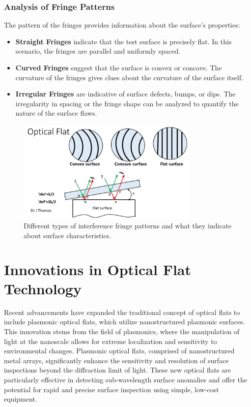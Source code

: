 \documentclass[../main.tex]{subfiles}
\begin{document}
\subsubsection{Analysis of Fringe Patterns}
The pattern of the fringes provides information about the surface's properties:
\begin{itemize}
    \item \textbf{Straight Fringes} indicate that the test surface is precisely flat. In this scenario, the fringes are parallel and uniformly spaced.
    \item \textbf{Curved Fringes} suggest that the surface is convex or concave. The curvature of the fringes gives clues about the curvature of the surface itself.
    \item \textbf{Irregular Fringes} are indicative of surface defects, bumps, or dips. The irregularity in spacing or the fringe shape can be analyzed to quantify the nature of the surface flaws.
\end{itemize}

\begin{frame}{}
    \begin{figure}[H]
    \centering
    \includegraphics[width=0.8\textwidth]{Images/Introduction/fringe_types}
    \caption{Different types of interference fringe patterns and what they indicate about surface characteristics.\cite{Joji_2023}}
    \label{fig:fringe-types}
    \end{figure}
\end{frame}

\section{Innovations in Optical Flat Technology}
Recent advancements have expanded the traditional concept of optical flats to include plasmonic optical flats, which utilize nanostructured plasmonic surfaces. This innovation stems from the field of plasmonics, where the manipulation of light at the nanoscale allows for extreme localization and sensitivity to environmental changes. Plasmonic optical flats, comprised of nanostructured metal arrays, significantly enhance the sensitivity and resolution of surface inspections beyond the diffraction limit of light. These new optical flats are particularly effective in detecting sub-wavelength surface anomalies and offer the potential for rapid and precise surface inspection using simple, low-cost equipment.
\end{document}
